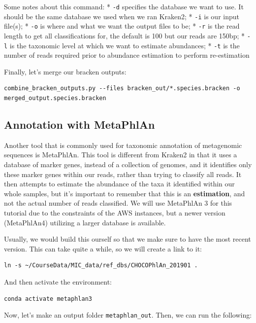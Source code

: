\documentclass[
]{book}
\begin{document}
Some notes about this command:
* \texttt{-d} specifies the database we want to use. It should be the same database we used when we ran Kraken2;
* \texttt{-i} is our input file(s);
* \texttt{-o} is where and what we want the output files to be;
* \texttt{-r} is the read length to get all classifications for, the default is 100 but our reads are 150bp;
* \texttt{-l} is the taxonomic level at which we want to estimate abundances;
* \texttt{-t} is the number of reads required prior to abundance estimation to perform re-estimation

Finally, let's merge our bracken outputs:

\begin{verbatim}
combine_bracken_outputs.py --files bracken_out/*.species.bracken -o merged_output.species.bracken
\end{verbatim}

\subsection{Annotation with MetaPhlAn}\label{annotation-with-metaphlan}

Another tool that is commonly used for taxonomic annotation of metagenomic sequences is MetaPhlAn. This tool is different from Kraken2 in that it uses a database of marker genes, instead of a collection of genomes, and it identifies only these marker genes within our reads, rather than trying to classify all reads. It then attempts to estimate the abundance of the taxa it identified within our whole samples, but it's important to remember that this is an \textbf{estimation}, and not the actual number of reads classified. We will use MetaPhlAn 3 for this tutorial due to the constraints of the AWS instances, but a newer version (MetaPhlAn4) utilizing a larger database is available.

Usually, we would build this ourself so that we make sure to have the most recent version. This can take quite a while, so we will create a link to it:

\begin{verbatim}
ln -s ~/CourseData/MIC_data/ref_dbs/CHOCOPhlAn_201901 .
\end{verbatim}

And then activate the environment:

\begin{verbatim}
conda activate metaphlan3
\end{verbatim}

Now, let's make an output folder \texttt{metaphlan\_out}. Then, we can run the following:
\end{document}
